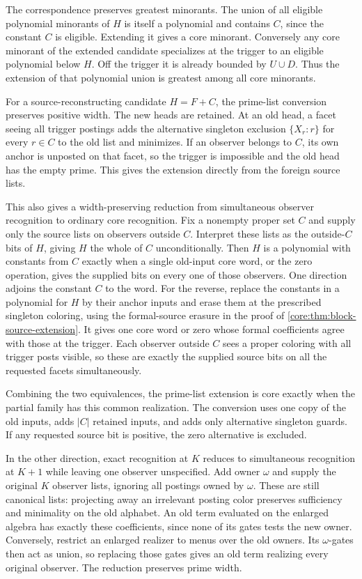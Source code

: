 The correspondence preserves greatest minorants.
The union of all eligible polynomial minorants
of $H$ is itself a polynomial and contains $C$,
since the constant $C$ is eligible. Extending
it gives a core minorant. Conversely any core
minorant of the extended candidate specializes
at the trigger to an eligible polynomial below
$H$. Off the trigger it is already bounded by
$U\cup D$. Thus the extension of that polynomial
union is greatest among all core minorants.

For a source-reconstructing candidate $H=F+C$,
the prime-list conversion preserves positive
width. The new heads are retained. At an old
head, a facet seeing all trigger postings adds
the alternative singleton exclusion
$\{X_r:r\}$ for every $r\in C$ to the old list
and minimizes. If an observer belongs to $C$,
its own anchor is unposted on that facet,
so the trigger is impossible and the old head
has the empty prime. This gives the extension
directly from the foreign source lists.

This also gives a width-preserving reduction from
simultaneous observer recognition to ordinary core
recognition. Fix a nonempty proper set $C$ and
supply only the source lists on observers outside
$C$. Interpret these lists as the outside-$C$ bits
of $H$, giving $H$ the whole of $C$ unconditionally.
Then $H$ is a polynomial with constants from $C$
exactly when a single old-input core word, or the
zero operation, gives the supplied bits on every
one of those observers. One direction adjoins the
constant $C$ to the word. For the reverse, replace
the constants in a polynomial for $H$ by their
anchor inputs and erase them at the prescribed
singleton coloring, using the formal-source
erasure in the proof of
\cref{core:thm:block-source-extension}. It gives one
core word or zero whose formal coefficients agree
with those at the trigger. Each observer outside
$C$ sees a proper coloring with all trigger posts
visible, so these are exactly the supplied source
bits on all the requested facets simultaneously.

Combining the two equivalences, the prime-list
extension is core exactly when the partial family
has this common realization. The conversion uses
one copy of the old inputs, adds $|C|$ retained
inputs, and adds only alternative singleton guards.
If any requested source bit is positive, the zero
alternative is excluded.

In the other direction, exact recognition at $K$
reduces to simultaneous recognition at $K+1$
while leaving one observer unspecified. Add owner
$\omega$ and supply the original $K$ observer
lists, ignoring all postings owned by $\omega$.
These are still canonical lists: projecting away
an irrelevant posting color preserves sufficiency
and minimality on the old alphabet. An old term
evaluated on the enlarged algebra has exactly
these coefficients, since none of its gates tests
the new owner. Conversely, restrict an enlarged
realizer to menus over the old owners. Its
$\omega$-gates then act as union, so replacing those
gates gives an old term realizing every original
observer. The reduction preserves prime width.

